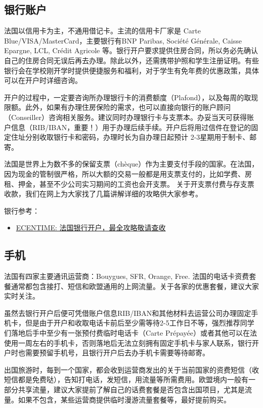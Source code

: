 \subsection{银行账户}

法国以信用卡为主，不通用借记卡。主流的信用卡厂家是 Carte Blue/VISA/MasterCard，主要银行有BNP Paribas, Société Générale, Caisse Epargne, LCL, Crédit Agricole 等。银行开户要求提供住房合同，所以务必先确认自己的住房合同无误后再去办理。除此以外，还需携带护照和学生注册证明。有些银行会在学校刚开学时提供便捷服务和福利，对于学生有免年费的优惠政策，具体可以在开户时详细咨询。

开户的过程中，一定要咨询所办理银行卡的消费额度（Plafond），以及每周的取现限额。此外，如果有办理住房保险的需求，也可以直接向银行的账户顾问（Conseiller）咨询相关服务。建议同时办理银行卡与支票本。办妥当天可获得账户信息（RIB/IBAN，重要！）用于办理后续手续。开户后将用过信件在登记的固定住址分别收取银行卡和密码，办理时长为自办理日起预计 2-3星期用于制卡、邮寄。

法国是世界上为数不多的保留支票（chèque）作为主要支付手段的国家。在法国，因为现金的管制很严格，所以大额的交易一般都是用支票支付的，比如学费、房租、押金，甚至不少公司实习期间的工资也会开支票。 关于开支票付费与存支票收款，我们在网上为大家找了几篇讲解详细的攻略供大家参考。

银行参考：
\begin{itemize}
    \item \href{https://www.ecentime.com/article/creation-compte-bancaire}{ECENTIME: 法国银行开户，最全攻略敬请查收}
\end{itemize}

\subsection{手机}

法国有四家主要通讯运营商：Bouygues, SFR, Orange, Free. 法国的电话卡资费套餐通常都包含接打、短信和欧盟通用的上网流量。关于各家的优惠套餐，建议大家实时关注。

虽然去银行开户后便可凭借账户信息RIB/IBAN和其他材料去运营公司办理固定手机卡，但是由于开户和收取电话卡前后至少需等待2-5工作日不等，强烈推荐同学们落地后手中至少有一张预付费临时电话卡（Carte Prépayée）或者其他可以在法使用一周左右的手机卡，否则落地后无法立刻拥有固定手机卡与家人联系，银行开户时也需要预留手机号，且银行开户后去办手机卡需要等待邮寄。

出国旅游时，每到一个国家，都会收到运营商发出的关于当前国家的资费短信（收短信都是免费哒），告知打电话，发短信，用流量等所需费用。欧盟境内一般有一部分共享流量，建议大家提前了解自己的话费套餐是否包含出国项目，尤其是流量。如果不包含，某些运营商提供临时漫游流量套餐等，最好提前购买。


